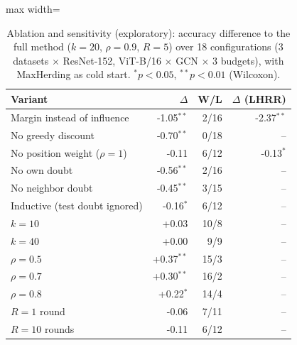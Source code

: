 \begin{table}[t]
\centering
\caption{Ablation and sensitivity (exploratory): accuracy difference to the full method ($k=20$, $\rho=0.9$, $R=5$) over 18 configurations (3 datasets $\times$ ResNet-152, ViT-B/16 $\times$ GCN $\times$ 3 budgets), with MaxHerding as cold start. $^{*}p<0.05$, $^{**}p<0.01$ (Wilcoxon).}
\label{tab:ablation}
\footnotesize
\begin{adjustbox}{max width=\columnwidth}
\begin{tabular}{lrrr}
\toprule
Variant & $\Delta$ & W/L & $\Delta$ (LHRR) \\
\midrule
Margin instead of influence & -1.05$^{**}$ & 2/16 & -2.37$^{**}$ \\
No greedy discount & -0.70$^{**}$ & 0/18 & -- \\
No position weight ($\rho=1$) & -0.11 & 6/12 & -0.13$^{*}$ \\
No own doubt & -0.56$^{**}$ & 2/16 & -- \\
No neighbor doubt & -0.45$^{**}$ & 3/15 & -- \\
Inductive (test doubt ignored) & -0.16$^{*}$ & 6/12 & -- \\
\midrule
$k=10$ & +0.03 & 10/8 & -- \\
$k=40$ & +0.00 & 9/9 & -- \\
$\rho=0.5$ & +0.37$^{**}$ & 15/3 & -- \\
$\rho=0.7$ & +0.30$^{**}$ & 16/2 & -- \\
$\rho=0.8$ & +0.22$^{*}$ & 14/4 & -- \\
$R=1$ round & -0.06 & 7/11 & -- \\
$R=10$ rounds & -0.11 & 6/12 & -- \\
\bottomrule
\end{tabular}
\end{adjustbox}
\end{table}
